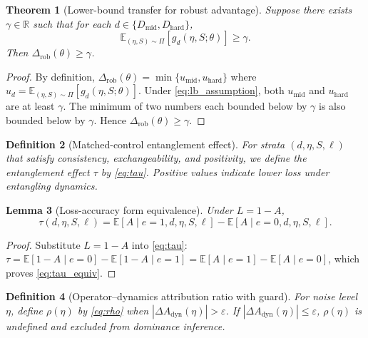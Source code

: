 \documentclass{article} %
\newtheorem{theorem}{Theorem}[section]
\newtheorem{lemma}[theorem]{Lemma}
\newtheorem{definition}[theorem]{Definition}
\begin{document}
\begin{theorem}[Lower-bound transfer for robust advantage]
\label{thm:delta_rob_lb}
Suppose there exists $\gamma\in\mathbb{R}$ such that for each $d\in\{D_{\mathrm{mid}},D_{\mathrm{hard}}\}$,
\begin{equation}
\label{eq:lb_assumption}
\mathbb{E}_{(\eta,S)\sim\Pi}[g_d(\eta,S;\theta)]\ge \gamma.
\end{equation}
Then $\Delta_{\mathrm{rob}}(\theta)\ge \gamma$.
\end{theorem}
\begin{proof}
By definition, $\Delta_{\mathrm{rob}}(\theta)=\min\{u_{\mathrm{mid}},u_{\mathrm{hard}}\}$ where $u_d=\mathbb{E}_{(\eta,S)\sim\Pi}[g_d(\eta,S;\theta)]$. Under \eqref{eq:lb_assumption}, both $u_{\mathrm{mid}}$ and $u_{\mathrm{hard}}$ are at least $\gamma$. The minimum of two numbers each bounded below by $\gamma$ is also bounded below by $\gamma$. Hence $\Delta_{\mathrm{rob}}(\theta)\ge\gamma$.
\end{proof}

\begin{definition}[Matched-control entanglement effect]
\label{def:tau}
For strata $(d,\eta,S,\ell)$ that satisfy consistency, exchangeability, and positivity, we define the entanglement effect $\tau$ by \eqref{eq:tau}. Positive values indicate lower loss under entangling dynamics.
\end{definition}

\begin{lemma}[Loss-accuracy form equivalence]
\label{lem:tau_equiv}
Under $L=1-A$,
\begin{equation}
\label{eq:tau_equiv}
\tau(d,\eta,S,\ell)=\mathbb{E}[A\mid e=1,d,\eta,S,\ell]-\mathbb{E}[A\mid e=0,d,\eta,S,\ell].
\end{equation}
\end{lemma}
\begin{proof}
Substitute $L=1-A$ into \eqref{eq:tau}: 
\(\tau=\mathbb{E}[1-A\mid e=0]-\mathbb{E}[1-A\mid e=1]=\mathbb{E}[A\mid e=1]-\mathbb{E}[A\mid e=0]\), which proves \eqref{eq:tau_equiv}.
\end{proof}

\begin{definition}[Operator--dynamics attribution ratio with guard]
\label{def:rho_guarded}
For noise level $\eta$, define $\rho(\eta)$ by \eqref{eq:rho} when $|\Delta A_{\mathrm{dyn}}(\eta)|>\varepsilon$. If $|\Delta A_{\mathrm{dyn}}(\eta)|\le\varepsilon$, $\rho(\eta)$ is undefined and excluded from dominance inference.
\end{definition}
\end{document}
